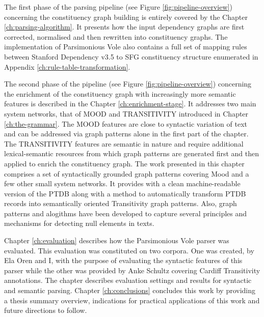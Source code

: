 The first phase of the parsing pipeline (see Figure \ref{fig:pipeline-overview}) concerning the constituency graph building is entirely covered by the Chapter \ref{ch:parsing-algorithm}. It presents how the input dependency graphs are first corrected, normalised and then rewritten into constituency graphs. The implementation of Parsimonious Vole also contains a full set of mapping rules between Stanford Dependency v3.5 to SFG constituency structure enumerated in Appendix \ref{ch:rule-table-transformation}.


The second phase of the pipeline (see Figure \ref{fig:pipeline-overview}) concerning the enrichment of the  constituency graph with increasingly more semantic features is described in the Chapter \ref{ch:enrichment-stage}. It addresses two main system networks, that of MOOD and TRANSITIVITY introduced in Chapter \ref{ch:the-grammar}. The MOOD features are close to syntactic variation of text and can be addressed via graph patterns alone in the first part of the chapter. The TRANSITIVITY features are semantic in nature and require additional lexical-semantic resources from which graph patterns are generated first and then applied to enrich the constituency graph. The work presented in this chapter comprises a set of syntactically grounded graph patterns covering Mood and a few other small system networks. It provides with a clean machine-readable version of the PTDB along with a method to automatically transform PTDB records into semantically oriented Transitivity graph patterns. Also, graph patterns and alogithms have been developed to capture several principles and mechanisms for detecting null elements in texts.

Chapter \ref{ch:evaluation} describes how the Parsimonious Vole parser was evaluated. This evaluation was constituted on two corpora. One was created, by Ela Oren and I, with the purpose of evaluating the syntactic features of this parser while the other was provided by Anke Schultz covering Cardiff Transitivity annotations. The chapter describes evaluation settings and results for syntactic and semantic parsing. Chapter \ref{ch:conclusions} concludes this work by providing a thesis summary overview, indications for practical applications of this work and future directions to follow. 